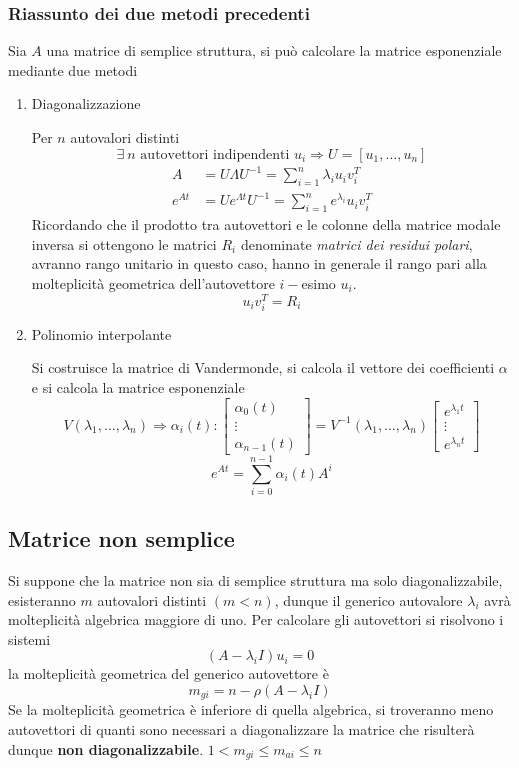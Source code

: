 \newpage
\subsubsection{Riassunto dei due metodi precedenti}
Sia $A$ una matrice di semplice struttura, si può calcolare la matrice
esponenziale mediante due metodi
\begin{enumerate}
 \item Diagonalizzazione

 Per $n$ autovalori distinti
 $$
 \exists\ n \text{ autovettori indipendenti } u_i \Rightarrow U=[u_1,\ldots,u_n]
 $$
 $$\begin{aligned}
 A &= U\Lambda U^{-1} = \sum_{i=1}^{n} \lambda_i u_iv_i^T\\
 e^{At} &= Ue^{\Lambda t} U^{-1} = \sum_{i=1}^{n} e^{\lambda_i}u_iv_i^T
 \end{aligned}$$
 Ricordando che il prodotto tra autovettori e le colonne della matrice modale
inversa si ottengono le matrici $R_i$ denominate \textit{matrici dei residui
polari}, avranno rango unitario in questo caso, hanno in generale il rango pari
alla molteplicità geometrica dell'autovettore $i-$esimo $u_i$.
$$
u_i v_i^T = R_i
$$

\item Polinomio interpolante

Si costruisce la matrice di Vandermonde, si calcola il vettore dei coefficienti
$\alpha$ e si calcola la matrice esponenziale
$$
V(\lambda_1,\ldots,\lambda_n) \Rightarrow \alpha_i(t):
\begin{bmatrix}
\alpha_0(t) \\
\vdots \\
\alpha_{n-1}(t)
\end{bmatrix} = V^{-1}(\lambda_1,\ldots,\lambda_n)
\begin{bmatrix}
e^{\lambda_1t}\\
\vdots \\
e^{\lambda_nt}
\end{bmatrix}
$$
$$
e^{At} =\sum_{i=0}^{n-1} \alpha_i(t)A^i
$$
\end{enumerate}

\subsection{Matrice non semplice}
Si suppone che la matrice non sia di semplice struttura ma solo
diagonalizzabile, esisteranno $m$ autovalori distinti $(m < n)$, dunque il
generico autovalore $\lambda_i$ avrà molteplicità algebrica maggiore di uno.
Per calcolare gli autovettori si risolvono i sistemi
$$
(A-\lambda_iI)u_i=0
$$
la molteplicità geometrica del generico autovettore è
$$
m_{gi}= n-\rho(A-\lambda_iI)
$$
Se la molteplicità geometrica è inferiore di quella algebrica, si troveranno
meno autovettori di quanti sono necessari a diagonalizzare la matrice che
risulterà dunque \textbf{non diagonalizzabile}. $1< m_{gi} \leq  m_{ai} \leq n $

